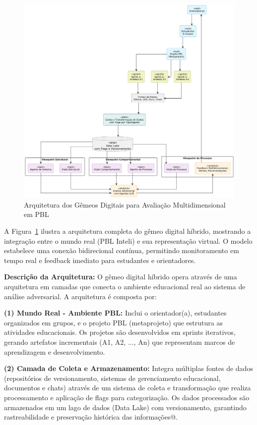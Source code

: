 \documentclass[english, spanish, brazilian]{modelo_dt}
\begin{document}
\begin{figure}[htbp]
\centering
\includegraphics[width=\linewidth,height=0.8\textheight,keepaspectratio]{assets/f1.png}
\caption{Arquitetura dos Gêmeos Digitais para Avaliação Multidimensional em PBL}
\label{fig:gemeo-digital-pbl}
\end{figure}

A Figura~\ref{fig:gemeo-digital-pbl} ilustra a arquitetura completa do gêmeo digital híbrido, mostrando a integração entre o mundo real (PBL Inteli) e sua representação virtual. O modelo estabelece uma conexão bidirecional contínua, permitindo monitoramento em tempo real e feedback imediato para estudantes e orientadores\@.

\textbf{Descrição da Arquitetura:} O gêmeo digital híbrido opera através de uma arquitetura em camadas que conecta o ambiente educacional real ao sistema de análise adversarial. A arquitetura é composta por:

\textbf{(1) Mundo Real - Ambiente PBL:} Inclui o orientador(a), estudantes organizados em grupos, e o projeto PBL (metaprojeto) que estrutura as atividades educacionais. Os projetos são desenvolvidos em sprints iterativos, gerando artefatos incrementais (A1, A2, ..., An) que representam marcos de aprendizagem e desenvolvimento\@.

\textbf{(2) Camada de Coleta e Armazenamento:} Integra múltiplas fontes de dados (repositórios de versionamento, sistemas de gerenciamento educacional, documentos e chats) através de um sistema de coleta e transformação que realiza processamento e aplicação de flags para categorização. Os dados processados são armazenados em um lago de dados (Data Lake) com versionamento, garantindo rastreabilidade e preservação histórica das informações@.
\end{document}
